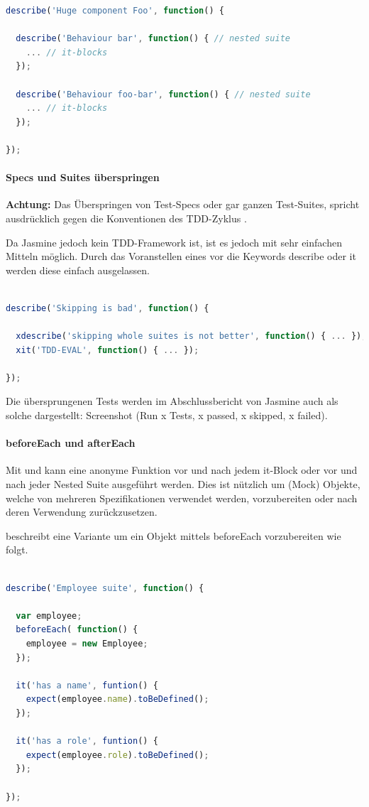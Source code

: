 \begin{lstlisting}[language=JavaScript]
describe('Huge component Foo', function() {

  describe('Behaviour bar', function() { // nested suite
    ... // it-blocks
  });

  describe('Behaviour foo-bar', function() { // nested suite
    ... // it-blocks
  });

});
\end{lstlisting}

\paragraph{Specs und Suites überspringen}
\textbf{Achtung:} Das Überspringen von Test-Specs oder gar ganzen Test-Suites, spricht ausdrücklich gegen die Konventionen des TDD-Zyklus \autocite{Beck:2003}.

Da Jasmine jedoch kein TDD-Framework ist, ist es jedoch mit sehr einfachen Mitteln möglich. Durch das Voranstellen eines  vor die Keywords describe oder it werden diese einfach ausgelassen.

\begin{lstlisting}[language=JavaScript]

describe('Skipping is bad', function() {

  xdescribe('skipping whole suites is not better', function() { ... });
  xit('TDD-EVAL', function() { ... });

});
\end{lstlisting}

Die übersprungenen Tests werden im Abschlussbericht von Jasmine auch als solche dargestellt:
Screenshot (Run x Tests, x passed, x skipped, x failed).

\paragraph{beforeEach und afterEach}

Mit  und  kann eine anonyme Funktion vor und nach jedem it-Block oder vor und nach jeder Nested Suite ausgeführt werden. Dies ist nützlich um (Mock) Objekte, welche von mehreren Spezifikationen verwendet werden, vorzubereiten oder nach deren Verwendung zurückzusetzen.

\cite[23]{Hahn:2013} beschreibt eine Variante um ein Objekt mittels beforeEach vorzubereiten wie folgt.
\begin{lstlisting}[language=JavaScript]

describe('Employee suite', function() {

  var employee;
  beforeEach( function() {
    employee = new Employee;
  });

  it('has a name', funtion() {
    expect(employee.name).toBeDefined();
  });

  it('has a role', funtion() {
    expect(employee.role).toBeDefined();
  });

});

\end{lstlisting}

